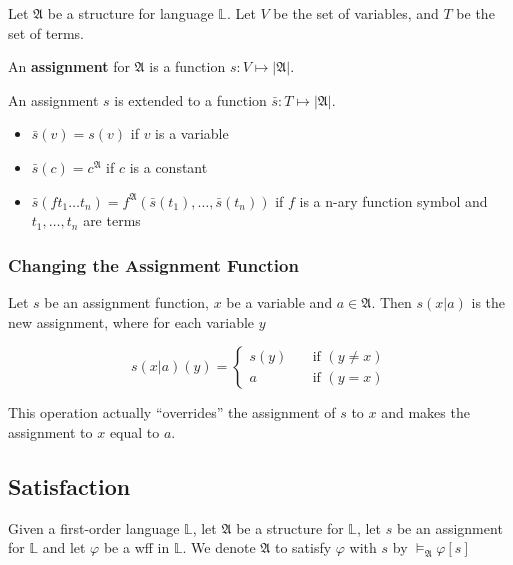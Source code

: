Let $\mathfrak{A}$ be a structure for language $\mathbb{L}$. Let $V$ be the set of variables, and $T$ be the set of terms.

\begin{definition}
    An \textbf{assignment} for $\mathfrak{A}$ is a function $s:V\mapsto|\mathfrak{A}|$.
\end{definition}

\begin{definition}
    An assignment $s$ is extended to a function $\bar{s}:T\mapsto|\mathfrak{A}|$.
    \begin{itemize}
        \item $\bar{s}(v) = s(v)$ if $v$ is a variable
        \item $\bar{s}(c) = c^{\mathfrak{A}}$ if $c$ is a constant
        \item $\bar{s}(ft_1\dots t_n) = f^{\mathfrak{A}}(\bar{s}(t_1),\dots,\bar{s}(t_n))$ if $f$ is a n-ary function symbol and $t_1,\dots,t_n$ are terms
    \end{itemize}
\end{definition}

\subsubsection{Changing the Assignment Function}

Let $s$ be an assignment function, $x$ be a variable and $a\in\mathfrak{A}$. Then $s(x|a)$ is the new assignment, where for each variable $y$

\[s(x|a)(y) = \begin{cases}
    s(y) &\quad \text{if $(y\neq x)$}\\
    a &\quad \text{if $(y=x)$}
\end{cases}\]

This operation actually ``overrides'' the assignment of $s$ to $x$ and makes the assignment to $x$ equal to $a$.

\subsection{Satisfaction}

Given a first-order language $\mathbb{L}$, let $\mathfrak{A}$ be a structure for $\mathbb{L}$, let $s$ be an assignment for $\mathbb{L}$ and let $\varphi$ be a wff in $\mathbb{L}$. We denote $\mathfrak{A}$ to satisfy $\varphi$ with $s$ by $\vDash_{\mathfrak{A}}\varphi[s]$

